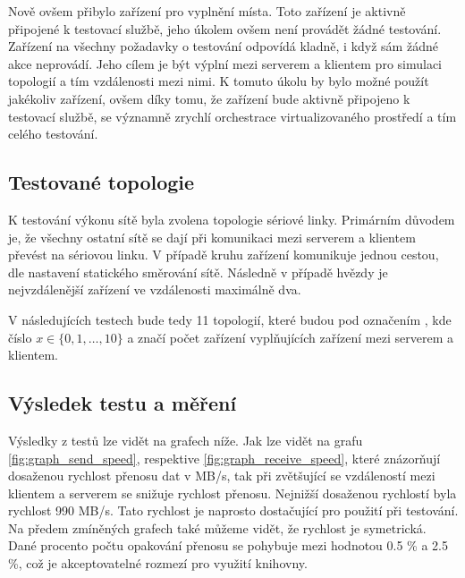 Nově ovšem přibylo zařízení pro vyplnění místa. Toto zařízení je aktivně připojené k testovací službě, jeho úkolem ovšem není provádět žádné testování. Zařízení na všechny požadavky o testování odpovídá kladně, i když sám žádné akce neprovádí. Jeho cílem je být výplní mezi serverem a klientem pro simulaci topologií a tím vzdálenosti mezi nimi. K tomuto úkolu by bylo možné použít jakékoliv zařízení, ovšem díky tomu, že zařízení bude aktivně připojeno k testovací službě, se významně zrychlí orchestrace virtualizovaného prostředí a tím celého testování.


\subsection{Testované topologie}

K testování výkonu sítě byla zvolena topologie sériové linky. Primárním důvodem je, že všechny ostatní sítě se dají při komunikaci mezi serverem a klientem převést na sériovou linku. V případě kruhu zařízení komunikuje jednou cestou, dle nastavení statického směrování sítě. Následně v případě hvězdy je nejvzdálenější zařízení ve vzdálenosti maximálně dva. 

V následujících testech bude tedy 11 topologií, které budou pod označením , kde číslo $x \in \{0,1,\dots, 10\}$ a značí počet zařízení vyplňujících zařízení mezi serverem a klientem.

\subsection{Výsledek testu a měření}

Výsledky z testů lze vidět na grafech níže. Jak lze vidět na grafu \ref{fig:graph_send_speed}, respektive \ref{fig:graph_receive_speed}, které znázorňují dosaženou rychlost přenosu dat v MB/s, tak při zvětšující se vzdáleností mezi klientem a serverem se snižuje rychlost přenosu. Nejnižší dosaženou rychlostí byla rychlost 990 MB/s. Tato rychlost je naprosto dostačující pro použití při testování. Na předem zmíněných grafech také můžeme vidět, že rychlost je symetrická. Dané procento počtu opakování přenosu se pohybuje mezi hodnotou 0.5 \% a 2.5 \%, což je akceptovatelné rozmezí pro využití knihovny.

